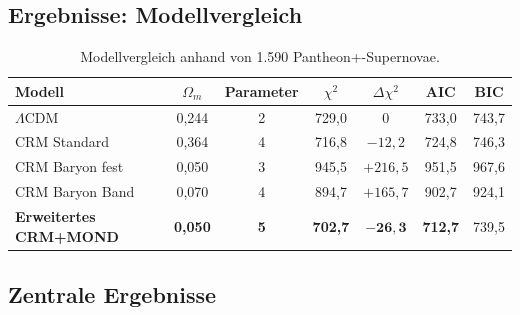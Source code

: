 \documentclass[aps,prd,twocolumn,superscriptaddress,nofootinbib]{revtex4-2}
\begin{document}
\subsection{Ergebnisse: Modellvergleich}

\begin{table}
\centering
\caption{Modellvergleich anhand von 1.590 Pantheon+-Supernovae.}
\label{tab:comparison}
\begin{tabular}{lcccccc}
\toprule
\textbf{Modell} & $\Omega_m$ & \textbf{Parameter} & $\chi^2$ & $\Delta\chi^2$ & AIC & BIC \\
\midrule
$\Lambda$CDM & 0,244 & 2 & 729,0 & 0 & 733,0 & 743,7 \\
CRM Standard & 0,364 & 4 & 716,8 & $-12{,}2$ & 724,8 & 746,3 \\
\midrule
CRM Baryon fest & 0,050 & 3 & 945,5 & $+216{,}5$ & 951,5 & 967,6 \\
CRM Baryon Band & 0,070 & 4 & 894,7 & $+165{,}7$ & 902,7 & 924,1 \\
\midrule
\textbf{Erweitertes CRM+MOND} & \textbf{0,050} & \textbf{5} & \textbf{702,7} & $\mathbf{-26{,}3}$ & \textbf{712,7} & 739,5 \\
\bottomrule
\end{tabular}
\end{table}

\subsection{Zentrale Ergebnisse}
\end{document}
